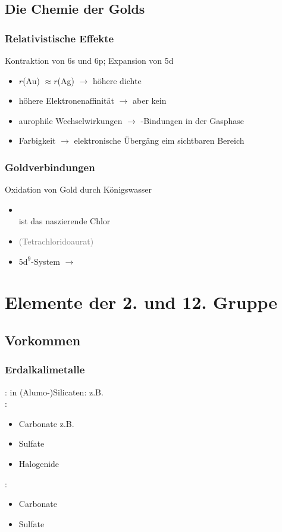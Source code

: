 \documentclass{article}
\begin{document}
\subsection{Die Chemie der Golds}
\subsubsection{Relativistische Effekte}
Kontraktion von 6s und 6p; Expansion von 5d
\begin{itemize}
    \item $r$(Au) $\approx r$(Ag) $\rightarrow$ höhere dichte
    \item höhere Elektronenaffinität $\rightarrow$  aber kein 
    \item aurophile Wechselwirkungen $\rightarrow$ -Bindungen in der Gasphase
    \item Farbigkeit $\rightarrow$ elektronische Übergäng eim sichtbaren Bereich
\end{itemize}

\subsubsection{Goldverbindungen}
Oxidation von Gold durch Königswasser
\begin{itemize}
    \item[] \\ ist das naszierende Chlor
    \item[]  \textcolor{gray}{(Tetrachloridoaurat)}
    \item {} $\mathrm{5d^9}$-System $\rightarrow$ 
\end{itemize}

\section{Elemente der 2. und 12. Gruppe}

\subsection{Vorkommen}
\subsubsection{Erdalkalimetalle}
: in (Alumo-)Silicaten: z.B. \\
: \begin{itemize}
    \item Carbonate z.B. 
    \item Sulfate
    \item Halogenide
\end{itemize}
: \begin{itemize}
    \item Carbonate
    \item Sulfate
\end{itemize}
\end{document}
